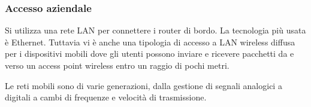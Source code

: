 \documentclass{subfiles}
\begin{document}
\subsubsection{Accesso aziendale}
    Si utilizza una rete LAN per connettere i router di bordo. La tecnologia più usata è Ethernet. Tuttavia vi è anche una tipologia di 
    accesso a LAN wireless diffusa per i dispositivi mobili dove gli utenti possono inviare e ricevere pacchetti da e verso un access 
    point wireless entro un raggio di pochi metri.

    \begin{Note*}
        Le reti mobili sono di varie generazioni, dalla gestione di segnali analogici a digitali a cambi di frequenze e velocità di 
        trasmissione.
    \end{Note*}    
\end{document}
